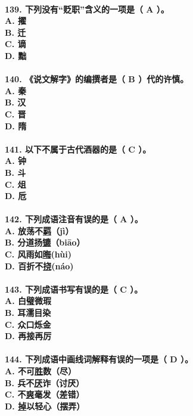 \documentclass[UTF8]{ctexart} %
\begin{document}
\paragraph{
139. 下列没有“贬职”含义的一项是（ \color{red}A\color{black} ）。 \\
    A. 擢 \\
    B. 迁 \\
    C. 谪 \\
    D. 黜
}
\paragraph{
140. 《说文解字》的编撰者是（ \color{red}B\color{black} ）代的许慎。 \\
    A. 秦 \\
    B. 汉 \\
    C. 晋 \\
    D. 隋
}
\paragraph{
141. 以下不属于古代酒器的是（ \color{red}C\color{black} ）。 \\
    A. 钟 \\
    B. 斗 \\
    C. 俎 \\
    D. 卮
}
\paragraph{
142. 下列成语注音有误的是（ \color{red}A\color{black} ）。 \\
    A. 放荡不\uline{羁}（jì） \\
    B. 分道扬\uline{镳}（biāo） \\
    C. 风雨如\uline{晦}(hùi) \\
    D. 百折不\uline{挠}(náo)
}
\paragraph{
143. 下列成语书写有误的是（ \color{red}C\color{black} ）。 \\
    A. 白璧微瑕 \\
    B. 耳濡目染 \\
    C. 众口烁金 \\
    D. 再接再厉
}
\paragraph{
144. 下列成语中画线词解释有误的一项是（ \color{red}D\color{black} ）。 \\
    A. 不可\uline{胜}数（尽） \\
    B. 兵不\uline{厌}诈（讨厌） \\
    C. 不\uline{爽}毫发（差错） \\
    D. \uline{掉}以轻心（摆弄）
}
\end{document}
